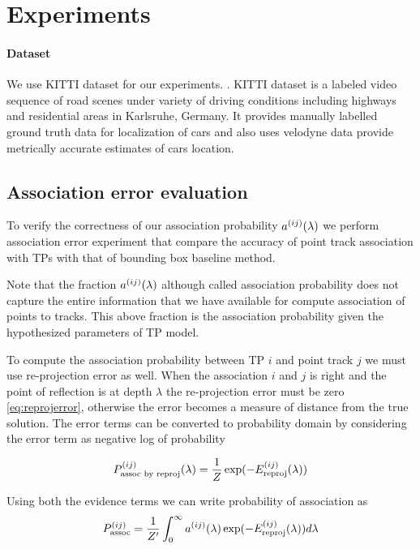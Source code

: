 \section{Experiments}
\label{sec:experiments}


\paragraph{Dataset} We use KITTI dataset for our experiments.  \cite{geiger2013vision}. KITTI dataset is a labeled video sequence of road scenes under variety of driving conditions including highways and residential areas in Karlsruhe, Germany. It provides manually labelled ground truth data for localization of cars and also uses velodyne data provide metrically accurate estimates of cars location.


\subsection{Association error evaluation}

To verify the correctness of our association probability $a^{(ij)}(\lambda)$ we perform
association error experiment that compare the accuracy of point track
association with TPs with that of bounding box baseline method.

Note that the fraction $a^{(ij)}(\lambda)$ although called association probability does
not capture the entire information that we have available for compute
association of points to tracks. This above fraction is the association
probability given the hypothesized parameters of TP model. 

To compute the association probability between TP $i$ and
point track $j$ we must use re-projection error as well. When the association
$i$ and $j$ is right and the point of reflection is at depth $\lambda$ the
re-projection error must be zero \eqref{eq:reprojerror}, otherwise the error
becomes a measure of distance from the true solution.
The error terms can be converted to probability domain by considering the error
term as negative log of probability

\begin{align}
  P^{(ij)}_{\text{assoc by reproj}}(\lambda) = \frac{1}{Z}\exp(-E^{(ij)}_{\text{reproj}}(\lambda))
\end{align}

Using both the evidence terms we can write probability of association as
\begin{align}
  P^{(ij)}_{\text{assoc}} = \frac{1}{Z'}\int_0^{\infty} a^{(ij)}(\lambda) \exp(-E^{(ij)}_{\text{reproj}}(\lambda))d\lambda
  \label{eq:prob-assoc}
\end{align}

